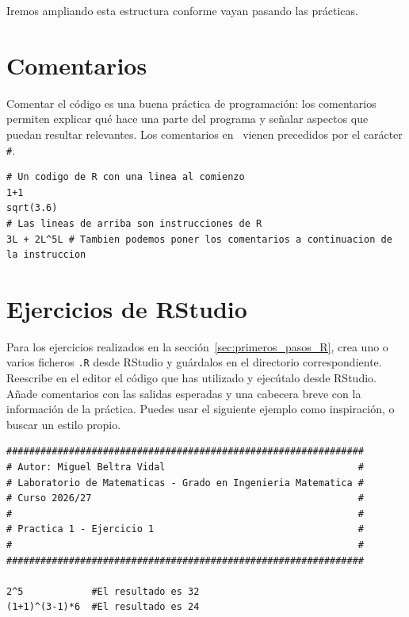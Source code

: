\documentclass[11pt,a4paper]{article}
\newcommand{\R}{\textcolor{azuluc}{\faIcon{r-project}}}
\theoremstyle{exercise}
\begin{document}
\noindent Iremos ampliando esta estructura conforme vayan pasando las prácticas.



\section{Comentarios}

Comentar el código es una buena práctica de programación: los comentarios permiten explicar qué hace una parte del programa y señalar aspectos que puedan resultar relevantes. Los comentarios en \R\ vienen precedidos por el carácter \texttt{\#}.

\begin{lstlisting}[style=rstyle]
# Un codigo de R con una linea al comienzo
1+1
sqrt(3.6)
# Las lineas de arriba son instrucciones de R
3L + 2L^5L # Tambien podemos poner los comentarios a continuacion de la instruccion
\end{lstlisting}


\section{Ejercicios de RStudio}

Para los ejercicios realizados en la sección~\ref{sec:primeros_pasos_R}, crea uno o varios ficheros \texttt{.R} desde RStudio y guárdalos en el directorio correspondiente. Reescribe en el editor el código que has utilizado y ejecútalo desde RStudio. Añade comentarios con las salidas esperadas y una cabecera breve con la información de la práctica. Puedes usar el siguiente ejemplo como inspiración, o buscar un estilo propio.

\medskip

\begin{lstlisting}[style=rstyle]
###############################################################
# Autor: Miguel Beltra Vidal                                  #
# Laboratorio de Matematicas - Grado en Ingenieria Matematica #
# Curso 2026/27                                               #
#                                                             #
# Practica 1 - Ejercicio 1                                    #
#                                                             #
###############################################################

2^5            #El resultado es 32
(1+1)^(3-1)*6  #El resultado es 24
\end{lstlisting}

\medskip
\end{document}
